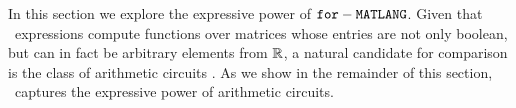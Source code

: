 



In this section we explore the expressive power of $\texttt{for}-\texttt{MATLANG}$. Given that \langfor\ expressions compute functions over matrices whose entries are not only boolean, but can in fact be arbitrary elements from $\mathbb{R}$, a natural candidate for comparison is the class of arithmetic circuits \cite{allender}. As we show in the remainder of this section, \langfor\ captures the expressive power of arithmetic circuits. %
%
%
%

